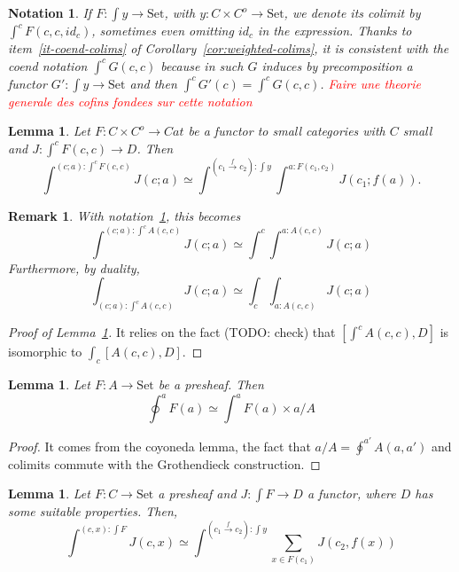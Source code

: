 \documentclass{article}
\newcommand{\Set}{\text{Set}}
\newtheorem{remark}[theorem]{Remark}
\newtheorem{lemma}[theorem]{Lemma}
\newtheorem{notation}[theorem]{Notation}
\begin{document}
\begin{notation}
  \label{n:colim-twisted}
 If $F : \int y \rightarrow \Set$, with $y: C\times C^o \rightarrow \Set$, we
 denote its colimit by $\int^c F(c,c,id_c)$, sometimes even omitting $id_c$ in the expression.
 Thanks to item~\ref{it-coend-colims} of Corollary~\ref{cor:weighted-colims},
 it is consistent with the coend notation
 $\int^c G(c,c)$ because in such $G$ induces by precomposition a functor
 $G':\int y \rightarrow \Set$ and then $\int^c G'(c) = \int^c G(c,c)$.
 \textcolor{red}{Faire une theorie generale des cofins fondees sur cette notation}
\end{notation}
\begin{lemma}
  \label{l:colim-colim}
  Let $F: C\times C^o \rightarrow Cat$ be a functor to small categories with $C$ small and
  $J:\int^{c}F(c,c)\rightarrow D$. Then
  \[
    \int^{(c;a): \int^c F(c,c)} J(c;a) \simeq
    \int^{(c_1 \xrightarrow{f}{} c_2): \int y} \int^{a: F(c_1,c_2)} J(c_1;f(a)).
  \] 
\end{lemma}
\begin{remark}
  With notation~\ref{n:colim-twisted}, this becomes
  \[
    \int^{(c;a): \int^c A(c,c)} J(c;a) \simeq
    \int^c \int^{a: A(c,c)} J(c;a)
  \] 
  Furthermore, by duality,
  \[
    \int_{(c;a): \int^c A(c,c)} J(c;a) \simeq
    \int_c \int_{a: A(c,c)} J(c;a)
  \] 
\end{remark}
\begin{proof}[Proof of Lemma~\ref{l:colim-colim}]
  It relies on the fact (TODO: check) that $[\int^c A(c,c), D]$ is isomorphic to
  $\int_c[A(c,c),D]$.
\end{proof}
\begin{lemma}
  \label{l:compute-grothendieck}
  Let $F:A \rightarrow \Set$  be a presheaf. Then
  \[
    \oint^a F(a) \simeq \int^a F(a)\times a/A
  \]
\end{lemma}
\begin{proof}
  It comes from the coyoneda lemma, the fact that $a/A = \oint^{a'} A(a,a')$ and colimits
  commute with the Grothendieck construction.
\end{proof}
\begin{lemma}
  \label{l:colim-on-elements}
  Let $F : C\rightarrow \Set$ a presheaf and $J:\int F \rightarrow D$ a functor,
  where $D$ has some suitable properties.
  Then,
  \[
    \int^{(c,x): \int F}  J(c,x)\simeq
    \int^{(c_1\xrightarrow{f} c_2):  \int y}
    \sum_{x\in F(c_1)}
    J(c_2,
    f (x))
  \] 
\end{lemma}
\end{document}
